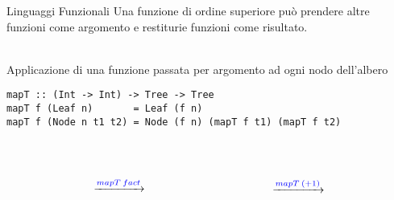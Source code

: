 \begin{frame}[containsverbatim]{Linguaggi Funzionali}
Una {\color{blue} funzione di ordine superiore} pu\`o prendere altre funzioni come argomento e restiturie funzioni come risultato. \\~\\

\begin{block}{\small Applicazione di una funzione passata per argomento ad ogni nodo dell'albero}
\begin{verbatim}
mapT :: (Int -> Int) -> Tree -> Tree 
mapT f (Leaf n)       = Leaf (f n)
mapT f (Node n t1 t2) = Node (f n) (mapT f t1) (mapT f t2)
\end{verbatim}
\end{block}
~\\
\begin{columns}

\begin{column}{0.2\textwidth}	
\centering
{}
\end{column}

\begin{column}{0.2\textwidth}	
\centering
	\Large $${\xrightarrow{\textcolor{blue}{mapT \: fact}}}$$
\end{column}

\begin{column}{0.2\textwidth}	
\centering
{}
\end{column}	

\begin{column}{0.2\textwidth}	
\centering
	\Large $${\xrightarrow{\textcolor{blue}{mapT \: (+1)}}}$$
\end{column}

\begin{column}{0.2\textwidth}	
\centering
{}
\end{column}	

\end{columns}
    
\end{frame}
